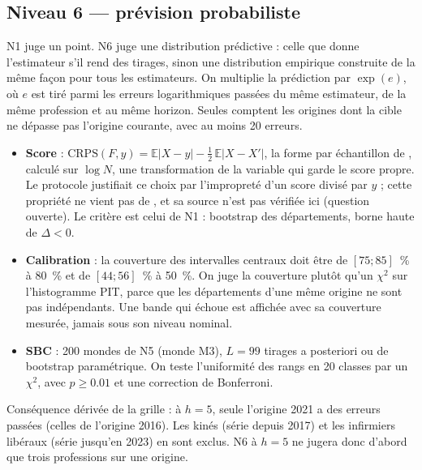 \documentclass[11pt]{article}
\begin{document}
\subsection{Niveau 6 --- prévision probabiliste}
N1 juge un point. N6 juge une distribution prédictive : celle que donne l'estimateur s'il rend des
tirages, sinon une distribution empirique construite de la même façon pour tous les estimateurs.
On multiplie la prédiction par $\exp(e)$, où $e$ est tiré parmi les erreurs logarithmiques passées
du même estimateur, de la même profession et au même horizon. Seules comptent les origines dont la
cible ne dépasse pas l'origine courante, avec au moins 20\suppose{} erreurs.
\begin{itemize}
  \item \textbf{Score} : $\mathrm{CRPS}(F, y) = \mathbb{E}|X - y| - \tfrac12\,\mathbb{E}|X - X'|$,
        la forme par échantillon de \citet[éq.~21, au signe près]{gneiting2007jasa}, calculé sur
        $\log N$, une transformation de la variable qui garde le score propre. Le protocole
        justifiait ce choix par l'impropreté d'un score divisé par $y$ ; cette propriété ne vient pas
        de \citet{gneiting2007jasa}, et sa source n'est pas vérifiée ici (question ouverte). Le critère est celui de N1 : bootstrap des départements, borne haute de $\Delta < 0$.
  \item \textbf{Calibration} : la couverture des intervalles centraux doit être de
        $[75 ; 85]$\suppose{}~\% à 80~\% et de $[44 ; 56]$\suppose{}~\% à 50~\%. On juge la
        couverture plutôt qu'un $\chi^2$ sur l'histogramme PIT, parce que les départements d'une
        même origine ne sont pas indépendants. Une bande qui échoue est affichée avec sa couverture
        mesurée, jamais sous son niveau nominal.
  \item \textbf{SBC} : 200 mondes de N5 (monde M3), $L = 99$ tirages a posteriori ou de bootstrap
        paramétrique. On teste l'uniformité des rangs en 20 classes par un $\chi^2$, avec
        $p \ge \num{0.01}$\suppose{} et une correction de Bonferroni.
\end{itemize}
Conséquence dérivée de la grille : à $h = 5$, seule l'origine 2021 a des erreurs passées (celles de
l'origine 2016). Les kinés (série depuis 2017) et les infirmiers libéraux (série jusqu'en 2023) en
sont exclus\derive{}. N6 à $h = 5$ ne jugera donc d'abord que trois professions sur une origine.
\end{document}
